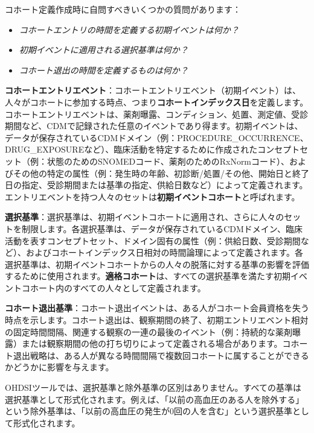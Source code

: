 \documentclass[
  11pt]{book}
\makeatletter
\providecommand{\tightlist}{%
  \setlength{\itemsep}{0pt}\setlength{\parskip}{0pt}}
\newenvironment{kframe}{%
\medskip{}
\setlength{\fboxsep}{.8em}
 \def\at@end@of@kframe{}%
 \ifinner\ifhmode%
  \def\at@end@of@kframe{\end{minipage}}%
  \begin{minipage}{\columnwidth}%
 \fi\fi%
 \def\FrameCommand##1{\hskip\@totalleftmargin \hskip-\fboxsep
 \colorbox{myShadeColor}{##1}\hskip-\fboxsep
     \hskip-\linewidth \hskip-\@totalleftmargin \hskip\columnwidth}%
 \MakeFramed {\advance\hsize-\width
   \@totalleftmargin\z@ \linewidth\hsize
   \@setminipage}}%
 {\par\unskip\endMakeFramed%
 \at@end@of@kframe}
\newenvironment{rmdblock}[1]
  {
  \begin{itemize}
  \renewcommand{\labelitemi}{
    \raisebox{-.7\height}[0pt][0pt]{
      {\setkeys{Gin}{width=3em,keepaspectratio}\texttt{[image: images/\#1]}}
    }
  }
  \setlength{\fboxsep}{1em}
  \begin{kframe}
  \item
  }
  {
  \end{kframe}
  \end{itemize}
  }
\newenvironment{rmdimportant}
  {\begin{rmdblock}{important}}
  {\end{rmdblock}}
\theoremstyle{definition}
\theoremstyle{definition}
\theoremstyle{definition}
\theoremstyle{definition}
\theoremstyle{remark}
\makeatother
\begin{document}
コホート定義作成時に自問すべきいくつかの質問があります：

\begin{itemize}
\tightlist
\item
  \emph{コホートエントリの時間を定義する初期イベントは何か？}
\item
  \emph{初期イベントに適用される選択基準は何か？}
\item
  \emph{コホート退出の時間を定義するものは何か？}
\end{itemize}

\textbf{コホートエントリエベント}：コホートエントリエベント（初期イベント）は、人々がコホートに参加する時点、つまり\textbf{コホートインデックス日}を定義します。コホートエントリエベントは、薬剤曝露、コンディション、処置、測定値、受診期間など、CDMで記録された任意のイベントであり得ます。初期イベントは、データが保存されているCDMドメイン（例：PROCEDURE\_OCCURRENCE、DRUG\_EXPOSUREなど）、臨床活動を特定するために作成されたコンセプトセット（例：状態のためのSNOMEDコード、薬剤のためのRxNormコード）、およびその他の特定の属性（例：発生時の年齢、初診断/処置/その他、開始日と終了日の指定、受診期間または基準の指定、供給日数など）によって定義されます。エントリエベントを持つ人々のセットは\textbf{初期イベントコホート}と呼ばれます。

\textbf{選択基準}：選択基準は、初期イベントコホートに適用され、さらに人々のセットを制限します。各選択基準は、データが保存されているCDMドメイン、臨床活動を表すコンセプトセット、ドメイン固有の属性（例：供給日数、受診期間など）、およびコホートインデックス日相対の時間論理によって定義されます。各選択基準は、初期イベントコホートからの人々の脱落に対する基準の影響を評価するために使用されます。\textbf{適格コホート}は、すべての選択基準を満たす初期イベントコホート内のすべての人々として定義されます。

\textbf{コホート退出基準}：コホート退出イベントは、ある人がコホート会員資格を失う時点を示します。コホート退出は、観察期間の終了、初期エントリエベント相対の固定時間間隔、関連する観察の一連の最後のイベント（例：持続的な薬剤曝露）または観察期間の他の打ち切りによって定義される場合があります。コホート退出戦略は、ある人が異なる時間間隔で複数回コホートに属することができるかどうかに影響を与えます。 

\begin{rmdimportant}
OHDSIツールでは、選択基準と除外基準の区別はありません。すべての基準は選択基準として形式化されます。例えば、「以前の高血圧のある人を除外する」という除外基準は、「以前の高血圧の発生が0回の人を含む」という選択基準として形式化されます。
\end{rmdimportant}
\end{document}
